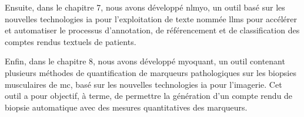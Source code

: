Ensuite, dans le chapitre 7, nous avons développé \gls{nlmyo}, un outil basé sur les nouvelles technologies \gls{ia} pour l'exploitation de texte nommée \gls{llms} pour accélérer et automatiser le processus d'annotation, de référencement et de classification des comptes rendus textuels de patients.

Enfin, dans le chapitre 8, nous avons développé \gls{myoquant}, un outil contenant plusieurs méthodes de quantification de marqueurs pathologiques sur les biopsies musculaires de \gls{mc}, basé sur les nouvelles technologies \gls{ia} pour l'imagerie. Cet outil a pour objectif, à terme, de permettre la génération d'un compte rendu de biopsie automatique avec des mesures quantitatives des marqueurs.